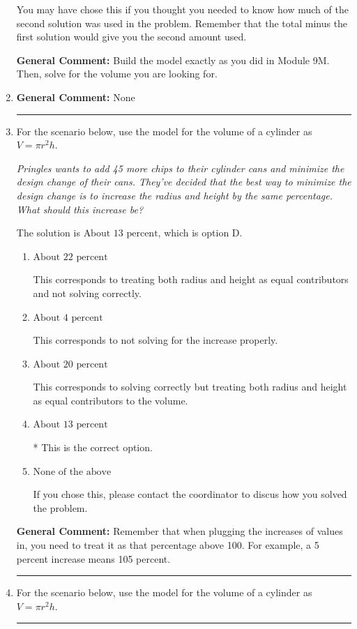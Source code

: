 \documentclass{extbook}[14pt]
\newcommand{\litem}[1]{\item #1

\rule{\textwidth}{0.4pt}}
\begin{document}
\begin{enumerate}
{\begin{enumerate}[label=\Alph*.]
You may have chose this if you thought you needed to know how much of the second solution was used in the problem. Remember that the total minus the first solution would give you the second amount used.
\end{enumerate}

\textbf{General Comment:} Build the model exactly as you did in Module 9M. Then, solve for the volume you are looking for.
}
\litem{


\textbf{General Comment:} None
}
\litem{
For the scenario below, use the model for the volume of a cylinder as $V = \pi r^2 h$.

\begin{center}
    \textit{ Pringles wants to add 45 \text{percent} more chips to their cylinder cans and minimize the design change of their cans. They've decided that the best way to minimize the design change is to increase the radius and height by the same percentage. What should this increase be? }
\end{center}
The solution is \( \text{About } 13 \text{ percent} \), which is option D.\begin{enumerate}[label=\Alph*.]
\item \( \text{About } 22 \text{ percent} \)

This corresponds to treating both radius and height as equal contributors and not solving correctly.
\item \( \text{About } 4 \text{ percent} \)

This corresponds to not solving for the increase properly.
\item \( \text{About } 20 \text{ percent} \)

This corresponds to solving correctly but treating both radius and height as equal contributors to the volume.
\item \( \text{About } 13 \text{ percent} \)

* This is the correct option.
\item \( \text{None of the above} \)

If you chose this, please contact the coordinator to discus how you solved the problem.
\end{enumerate}

\textbf{General Comment:} Remember that when plugging the increases of values in, you need to treat it as that percentage above 100. For example, a 5 percent increase means 105 percent.
}
\litem{
For the scenario below, use the model for the volume of a cylinder as $V = \pi r^2 h$.

}
\end{enumerate}
\end{document}
